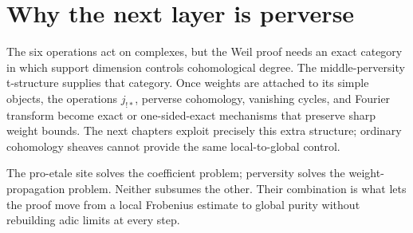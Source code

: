 \section{Why the next layer is perverse}

The six operations act on complexes, but the Weil proof needs an exact
category in which support dimension controls cohomological degree.
The middle-perversity t-structure supplies that category.  Once weights are
attached to its simple objects, the operations \(j_{!*}\), perverse
cohomology, vanishing cycles, and Fourier transform become exact or
one-sided-exact mechanisms that preserve sharp weight bounds.  The next
chapters exploit precisely this extra structure; ordinary cohomology sheaves
cannot provide the same local-to-global control.

\begin{powerbox}
The pro-etale site solves the coefficient problem; perversity solves the
weight-propagation problem.  Neither subsumes the other.  Their combination
is what lets the proof move from a local Frobenius estimate to global purity
without rebuilding adic limits at every step.
\end{powerbox}


